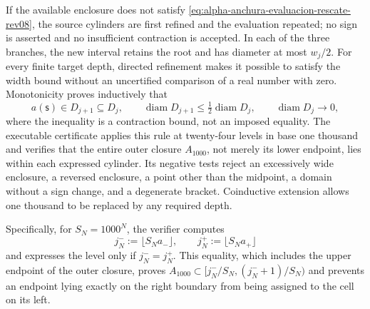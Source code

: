 If the available enclosure does not satisfy
\eqref{eq:alpha-anchura-evaluacion-rescate-rev08}, the source cylinders are
first refined and the evaluation repeated; no sign is asserted and no
insufficient contraction is accepted. In each of the three branches, the new
interval retains the root and has diameter at most \(w_j/2\). For every
finite target depth, directed refinement makes it possible to satisfy the
width bound without an uncertified comparison of a real number with zero.
Monotonicity proves inductively that
\begin{equation}
 a(\mathsf s)\in D_{j+1}\subseteq D_j,\qquad
 \operatorname{diam}D_{j+1}\leq
 \tfrac12\operatorname{diam}D_j,
 \qquad \operatorname{diam}D_j\longrightarrow0,
 \label{eq:alpha-biseccion-racional}
\end{equation}
where the inequality is a contraction bound, not an imposed equality.
The executable certificate applies this rule at twenty-four levels in base
one thousand and verifies that the entire outer closure \(A_{1000}\), not
merely its lower endpoint, lies within each expressed cylinder. Its negative
tests reject an excessively wide enclosure, a reversed enclosure, a point
other than the midpoint, a domain without a sign change, and a degenerate
bracket. Coinductive extension allows one thousand to be replaced by any
required depth.

Specifically, for \(S_N=1000^N\), the verifier computes
\begin{equation}
 j_N^-:=\lfloor S_Na_-\rfloor,
 \qquad j_N^+:=\lfloor S_Na_+\rfloor
 \label{eq:alpha-indices-cilindro-dirigidos-rev08}
\end{equation}
and expresses the level only if \(j_N^-=j_N^+\). This equality, which includes
the upper endpoint of the outer closure, proves
\(A_{1000}\subset[j_N^-/S_N,(j_N^-+1)/S_N)\) and prevents an endpoint
lying exactly on the right boundary from being assigned to the cell on its left.


